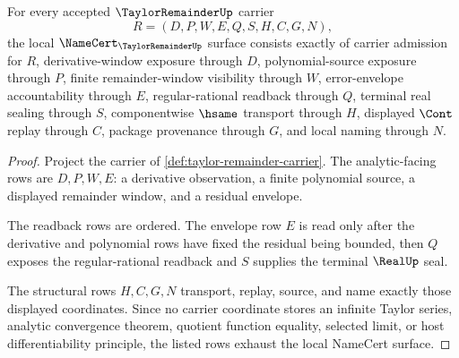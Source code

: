 \begin{theorem}
\label{thm:taylor-remainder-namecert-obligations}
For every accepted $\TaylorRemainderUp$ carrier
$$
R=(D,P,W,E,Q,S,H,C,G,N),
$$
the local $\NameCert_{\TaylorRemainderUp}$ surface consists exactly of carrier admission for $R$, derivative-window exposure through $D$, polynomial-source exposure through $P$, finite remainder-window visibility through $W$, error-envelope accountability through $E$, regular-rational readback through $Q$, terminal real sealing through $S$, componentwise $\hsame$ transport through $H$, displayed $\Cont$ replay through $C$, package provenance through $G$, and local naming through $N$.
\end{theorem}
\begin{proof}
Project the carrier of \autoref{def:taylor-remainder-carrier}. The analytic-facing rows are $D,P,W,E$: a derivative observation, a finite polynomial source, a displayed remainder window, and a residual envelope.

The readback rows are ordered. The envelope row $E$ is read only after the derivative and polynomial rows have fixed the residual being bounded, then $Q$ exposes the regular-rational readback and $S$ supplies the terminal $\RealUp$ seal.

The structural rows $H,C,G,N$ transport, replay, source, and name exactly those displayed coordinates. Since no carrier coordinate stores an infinite Taylor series, analytic convergence theorem, quotient function equality, selected limit, or host differentiability principle, the listed rows exhaust the local NameCert surface.
\end{proof}

